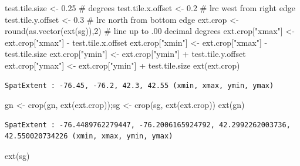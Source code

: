 \documentclass[
  letterpaper,
  DIV=11,
  numbers=noendperiod]{scrartcl}
\newenvironment{Shaded}{\begin{snugshade}}{\end{snugshade}}
\newcommand{\CommentTok}[1]{\textcolor[rgb]{0.37,0.37,0.37}{#1}}
\newcommand{\DecValTok}[1]{\textcolor[rgb]{0.68,0.00,0.00}{#1}}
\newcommand{\FloatTok}[1]{\textcolor[rgb]{0.68,0.00,0.00}{#1}}
\newcommand{\FunctionTok}[1]{\textcolor[rgb]{0.28,0.35,0.67}{#1}}
\newcommand{\NormalTok}[1]{\textcolor[rgb]{0.00,0.23,0.31}{#1}}
\newcommand{\OtherTok}[1]{\textcolor[rgb]{0.00,0.23,0.31}{#1}}
\newcommand{\SpecialCharTok}[1]{\textcolor[rgb]{0.37,0.37,0.37}{#1}}
\newcommand{\StringTok}[1]{\textcolor[rgb]{0.13,0.47,0.30}{#1}}
\begin{document}
\begin{Shaded}
\begin{Highlighting}[]
\NormalTok{test.tile.size }\OtherTok{\textless{}{-}} \FloatTok{0.25}  \CommentTok{\# degrees}
\NormalTok{test.tile.x.offset }\OtherTok{\textless{}{-}} \FloatTok{0.2} \CommentTok{\# lrc west from right edge}
\NormalTok{test.tile.y.offset }\OtherTok{\textless{}{-}} \FloatTok{0.3}  \CommentTok{\# lrc north from bottom edge}
\NormalTok{ext.crop }\OtherTok{\textless{}{-}} \FunctionTok{round}\NormalTok{(}\FunctionTok{as.vector}\NormalTok{(}\FunctionTok{ext}\NormalTok{(sg)),}\DecValTok{2}\NormalTok{) }\CommentTok{\# line up to .00 decimal degrees}
\NormalTok{ext.crop[}\StringTok{"xmax"}\NormalTok{] }\OtherTok{\textless{}{-}}\NormalTok{ ext.crop[}\StringTok{"xmax"}\NormalTok{] }\SpecialCharTok{{-}}\NormalTok{ test.tile.x.offset}
\NormalTok{ext.crop[}\StringTok{"xmin"}\NormalTok{] }\OtherTok{\textless{}{-}}\NormalTok{ ext.crop[}\StringTok{"xmax"}\NormalTok{] }\SpecialCharTok{{-}}\NormalTok{ test.tile.size}
\NormalTok{ext.crop[}\StringTok{"ymin"}\NormalTok{] }\OtherTok{\textless{}{-}}\NormalTok{ ext.crop[}\StringTok{"ymin"}\NormalTok{] }\SpecialCharTok{+}\NormalTok{ test.tile.y.offset}
\NormalTok{ext.crop[}\StringTok{"ymax"}\NormalTok{] }\OtherTok{\textless{}{-}}\NormalTok{ ext.crop[}\StringTok{"ymin"}\NormalTok{] }\SpecialCharTok{+}\NormalTok{ test.tile.size}
\FunctionTok{ext}\NormalTok{(ext.crop)}
\end{Highlighting}
\end{Shaded}

\begin{verbatim}
SpatExtent : -76.45, -76.2, 42.3, 42.55 (xmin, xmax, ymin, ymax)
\end{verbatim}

\begin{Shaded}
\begin{Highlighting}[]
\NormalTok{gn }\OtherTok{\textless{}{-}} \FunctionTok{crop}\NormalTok{(gn, }\FunctionTok{ext}\NormalTok{(ext.crop));sg }\OtherTok{\textless{}{-}} \FunctionTok{crop}\NormalTok{(sg, }\FunctionTok{ext}\NormalTok{(ext.crop))}
\FunctionTok{ext}\NormalTok{(gn)}
\end{Highlighting}
\end{Shaded}

\begin{verbatim}
SpatExtent : -76.4489762279447, -76.2006165924792, 42.2992262003736, 42.550020734226 (xmin, xmax, ymin, ymax)
\end{verbatim}

\begin{Shaded}
\begin{Highlighting}[]
\FunctionTok{ext}\NormalTok{(sg)}
\end{Highlighting}
\end{Shaded}
\end{document}
